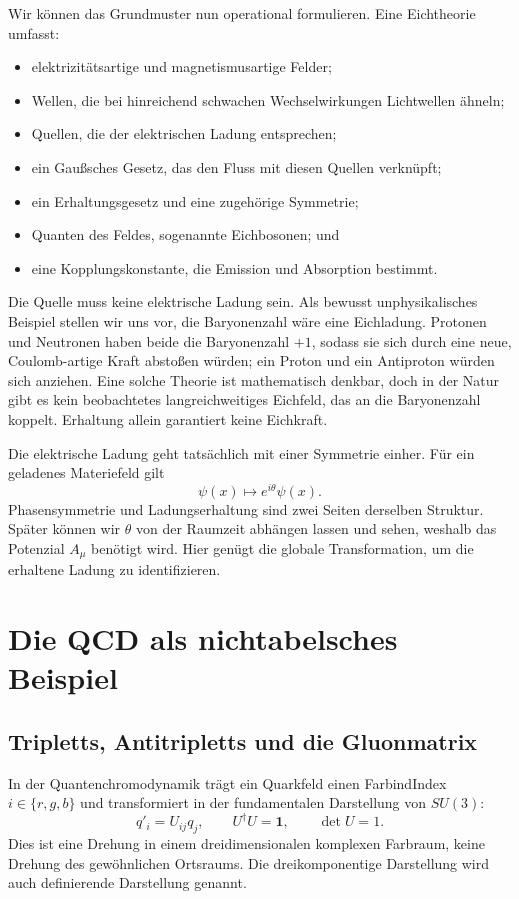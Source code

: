 Wir können das Grundmuster nun operational formulieren. Eine Eichtheorie umfasst:
\begin{itemize}\item elektrizitätsartige und magnetismusartige Felder;
\item Wellen, die bei hinreichend schwachen Wechselwirkungen Lichtwellen ähneln;
\item Quellen, die der elektrischen Ladung entsprechen;
\item ein Gaußsches Gesetz, das den Fluss mit diesen Quellen verknüpft;
\item ein Erhaltungsgesetz und eine zugehörige Symmetrie;
\item Quanten des Feldes, sogenannte Eichbosonen; und
\item eine Kopplungskonstante, die Emission und Absorption bestimmt.
\end{itemize}
Die Quelle muss keine elektrische Ladung sein. Als bewusst unphysikalisches Beispiel stellen wir uns vor, die Baryonenzahl wäre eine Eichladung. Protonen und Neutronen haben beide die Baryonenzahl \(+1\), sodass sie sich durch eine neue, Coulomb-artige Kraft abstoßen würden; ein Proton und ein Antiproton würden sich anziehen. Eine solche Theorie ist mathematisch denkbar, doch in der Natur gibt es kein beobachtetes langreichweitiges Eichfeld, das an die Baryonenzahl koppelt. Erhaltung allein garantiert keine Eichkraft.

Die elektrische Ladung geht tatsächlich mit einer Symmetrie einher. Für ein geladenes Materiefeld gilt
\begin{equation}
\psi(x)\longmapsto e^{i\theta}\psi(x).
\label{eq:l5-u1}
\end{equation}
Phasensymmetrie und Ladungserhaltung sind zwei Seiten derselben Struktur. Später können wir \(\theta\) von der Raumzeit abhängen lassen und sehen, weshalb das Potenzial \(A_\mu\) benötigt wird. Hier genügt die globale Transformation, um die erhaltene Ladung zu identifizieren.

\section{Die QCD als nichtabelsches Beispiel}

\subsection{Tripletts, Antitripletts und die Gluonmatrix}

In der Quantenchromodynamik trägt ein Quarkfeld einen FarbindIndex \(i\in\{r,g,b\}\) und transformiert in der fundamentalen Darstellung von \(SU(3)\):
\begin{equation}
q'_i=U_{ij}q_j,
\qquad
U^\dagger U=\boldsymbol 1,
\qquad
\det U=1.
\label{eq:l5-q-transform}
\end{equation}
Dies ist eine Drehung in einem dreidimensionalen komplexen Farbraum, keine Drehung des gewöhnlichen Ortsraums. Die dreikomponentige Darstellung wird auch definierende Darstellung genannt.

